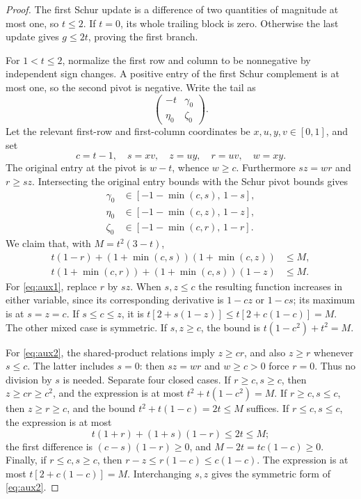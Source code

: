 \documentclass[11pt,reqno]{amsart}
\theoremstyle{definition}
\theoremstyle{remark}
\begin{document}
\begin{proof}
The first Schur update is a difference of two quantities of magnitude at
most one, so \(t\le2\). If \(t=0\), its whole trailing block is zero.
Otherwise the last update gives \(g\le2t\), proving the first branch.

For \(1<t\le2\), normalize the first row and column to be nonnegative by
independent sign changes. A positive entry of the first Schur complement
is at most one, so the second pivot is negative. Write the tail as
\[
\begin{pmatrix}-t&\gamma_0\\\eta_0&\zeta_0\end{pmatrix}.
\]
Let the relevant first-row and first-column coordinates be
\(x,u,y,v\in[0,1]\), and set
\[
c=t-1,\quad s=xv,\quad z=uy,\quad r=uv,\quad w=xy.
\]
The original entry at the pivot is \(w-t\), whence \(w\ge c\).
Furthermore \(sz=wr\) and \(r\ge sz\). Intersecting the original entry
bounds with the Schur pivot bounds gives
\begin{equation}\label{eq:threeintervals}
\begin{split}
\gamma_0&\in[-1-\min(c,s),\,1-s],\\
\eta_0&\in[-1-\min(c,z),\,1-z],\\
\zeta_0&\in[-1-\min(c,r),\,1-r].
\end{split}
\end{equation}
We claim that, with \(M=t^2(3-t)\),
\begin{align}
t(1-r)+(1+\min(c,s))(1+\min(c,z))&\le M,\label{eq:aux1}\\
t(1+\min(c,r))+(1+\min(c,s))(1-z)&\le M.\label{eq:aux2}
\end{align}
For \eqref{eq:aux1}, replace \(r\) by \(sz\). When \(s,z\le c\)
the resulting function increases in either variable, since its
corresponding derivative is \(1-cz\) or \(1-cs\); its maximum is at
\(s=z=c\). If \(s\le c\le z\), it is
\(t[2+s(1-z)]\le t[2+c(1-c)]=M\).
The other mixed case is symmetric. If \(s,z\ge c\), the bound is
\(t(1-c^2)+t^2=M\).

For \eqref{eq:aux2}, the shared-product relations imply
\(z\ge cr\), and also \(z\ge r\) whenever \(s\le c\).
The latter includes \(s=0\): then \(sz=wr\) and \(w\ge c>0\)
force \(r=0\). Thus no division by \(s\) is needed.
Separate four closed cases.
If \(r\ge c,s\ge c\), then \(z\ge cr\ge c^2\), and the expression is at
most \(t^2+t(1-c^2)=M\).
If \(r\ge c,s\le c\), then \(z\ge r\ge c\), and the bound
\(t^2+t(1-c)=2t\le M\) suffices.
If \(r\le c,s\le c\), the expression is at most
\[
t(1+r)+(1+s)(1-r)\le2t\le M;
\]
the first difference is \((c-s)(1-r)\ge0\), and
\(M-2t=tc(1-c)\ge0\).
Finally, if \(r\le c,s\ge c\), then
\(r-z\le r(1-c)\le c(1-c)\).
The expression is at most \(t[2+c(1-c)]=M\).
Interchanging \(s,z\) gives the symmetric form of \eqref{eq:aux2}.


\end{proof}
\end{document}
